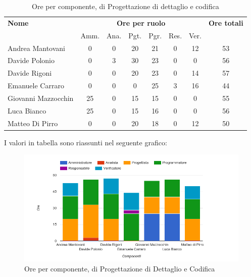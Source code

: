 \begin{table}[H]
\begin{tabular}{lccccccc}
\toprule
    \textbf{Nome}  & \multicolumn{6}{c}{\textbf{Ore per ruolo}} & \textbf{Ore totali} \\
     & Amm. & Ana. & Pgt. & Pgr. & Res. & Ver. & \\
    \midrule
    
	   Andrea Mantovani & 0 & 0 & 20 & 21 & 0 & 12 & 53 \\
	     Davide Polonio & 0 & 3 & 30 & 23 & 0 & 0 & 56 \\
	      Davide Rigoni & 0 & 0 & 20 & 23 & 0 & 14 & 57 \\
	   Emanuele Carraro & 0 & 0 & 0 & 25 & 3 & 16 & 44 \\
	Giovanni Mazzocchin & 25 & 0 & 15 & 15 & 0 & 0 & 55 \\
	        Luca Bianco & 25 & 0 & 15 & 16 & 0 & 0 & 56 \\
	    Matteo Di Pirro & 0 & 0 & 20 & 18 & 0 & 12 & 50 \\
    
    
    \bottomrule
\end{tabular}
\caption{Ore per componente,  di Progettazione di dettaglio e codifica}
\end{table}

I valori in tabella sono riassunti nel seguente grafico: \\ 

    \begin{figure}[H]
      \begin{center}
        \includegraphics[width=15cm]{res/img/suddivisioneRuoloProspettoOrario/orePerComponenteProgettazioneDettaglioCodifica.png}
      \caption{Ore per componente,  di Progettazione di Dettaglio e Codifica}
      \end{center} 
    \end{figure}    
    
